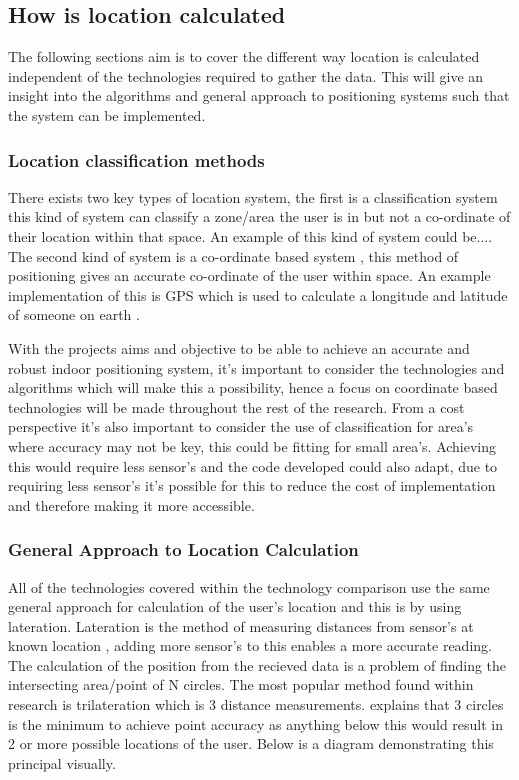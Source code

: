 \subsection{How is location calculated}
The following sections aim is to cover the different way location is calculated independent of the technologies required to gather the data. This will give an insight into the algorithms and general approach to positioning systems such that the system can be implemented. 

\subsubsection{Location classification methods}
There exists two key types of location system, the first is a classification system \citetemp this kind of system can classify a zone/area the user is in but not a co-ordinate of their location within that space. An example of this kind of system could be....
The second kind of system is a co-ordinate based system \citetemp, this method of positioning gives an accurate co-ordinate of the user within space. An example implementation of this is GPS which is used to calculate a longitude and latitude of someone on earth \citetemp.

With the projects aims and objective to be able to achieve an accurate and robust indoor positioning system, it's important to consider the technologies and algorithms which will make this a possibility, hence a focus on coordinate based technologies will be made throughout the rest of the research. From a cost perspective it's also important to consider the use of classification for area's where accuracy may not be key, this could be fitting for small area's. Achieving this would require less sensor's and the code developed could also adapt, due to requiring less sensor's it's possible for this to reduce the cost of implementation and therefore making it more accessible.

\subsubsection{General Approach to Location Calculation}
All of the technologies covered within the technology comparison use the same general approach for calculation of the user's location and this is by using lateration. Lateration is the method of measuring distances from sensor's at known location \citetemp, adding more sensor's to this enables a more accurate reading. The calculation of the position from the recieved data is a problem of finding the intersecting area/point of N circles. The most popular method found within research is trilateration which is 3 distance measurements. \citetemp explains that 3 circles is the minimum to achieve point accuracy as anything below this would result in 2 or more possible locations of the user. Below is a diagram demonstrating this principal visually.

